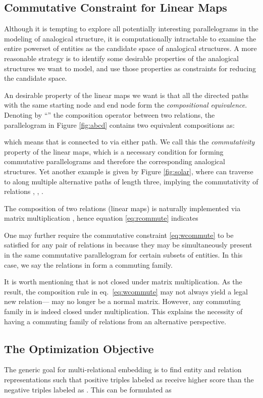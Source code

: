 \documentclass{article}
\begin{document}
\subsection{Commutative Constraint for Linear Maps}
Although it is tempting to explore all potentially interesting parallelograms in the modeling of analogical structure, it is computationally intractable to examine the entire powerset of entities as the candidate space of analogical structures.
A more reasonable strategy is to identify some desirable properties of the analogical structures we want to model,  and use those properties as constraints for reducing the candidate space. 

An desirable property of the linear maps we want is 
that all the directed paths with the same starting node and end node form the \textit{compositional equivalence}.
Denoting by ``'' the composition operator between two relations,
the parallelogram in Figure \ref{fig:abcd} contains two  equivalent compositions as:

which means that  is connected to  via either path.
We call this the \textit{commutativity} property of the linear maps, which is a
necessary condition for forming commutative parallelograms and therefore the corresponding analogical structures.
Yet another example is given by Figure \ref{fig:solar},
where  can traverse to  along multiple alternative paths of length three,
implying the commutativity of relations , , .

The composition of two relations (linear maps) is naturally implemented via matrix multiplication \cite{DBLP:journals/corr/YangYHGD14a, guu2015traversing},
hence equation \eqref{eq:rcommute} indicates

One may further require the commutative constraint \eqref{eq:wcommute} to be satisfied for any pair of relations in  because they may be simultaneously present in the same commutative parallelogram for certain subsets of entities.
In this case,
we say the relations in  form a commuting family.




It is worth mentioning that  is not closed under matrix multiplication.
As the result,
the composition rule in eq.\ \eqref{eq:wcommute} may not always yield a legal new relation--- may no longer be a normal matrix.
However,
any commuting family in  is indeed closed under multiplication.
This explains the necessity of having a commuting family of relations from an alternative perspective.

\subsection{The Optimization Objective}
The generic goal for multi-relational embedding
is to find entity and relation representations 
such that positive triples labeled as  receive higher score than the negative triples labeled as .
This can be formulated as
\end{document}
